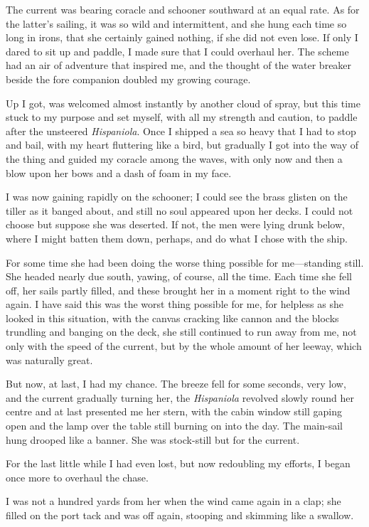 The current was bearing coracle and schooner southward at an equal rate. As for the latter’s sailing, it was so wild and intermittent, and she hung each time so long in irons, that she certainly gained nothing, if she did not even lose. If only I dared to sit up and paddle, I made sure that I could overhaul her. The scheme had an air of adventure that inspired me, and the thought of the water breaker beside the fore companion doubled my growing courage.

Up I got, was welcomed almost instantly by another cloud of spray, but this time stuck to my purpose and set myself, with all my strength and caution, to paddle after the unsteered \textit{Hispaniola}. Once I shipped a sea so heavy that I had to stop and bail, with my heart fluttering like a bird, but gradually I got into the way of the thing and guided my coracle among the waves, with only now and then a blow upon her bows and a dash of foam in my face.

I was now gaining rapidly on the schooner; I could see the brass glisten on the tiller as it banged about, and still no soul appeared upon her decks. I could not choose but suppose she was deserted. If not, the men were lying drunk below, where I might batten them down, perhaps, and do what I chose with the ship.

For some time she had been doing the worse thing possible for me---standing still. She headed nearly due south, yawing, of course, all the time. Each time she fell off, her sails partly filled, and these brought her in a moment right to the wind again. I have said this was the worst thing possible for me, for helpless as she looked in this situation, with the canvas cracking like cannon and the blocks trundling and banging on the deck, she still continued to run away from me, not only with the speed of the current, but by the whole amount of her leeway, which was naturally great.

But now, at last, I had my chance. The breeze fell for some seconds, very low, and the current gradually turning her, the \textit{Hispaniola} revolved slowly round her centre and at last presented me her stern, with the cabin window still gaping open and the lamp over the table still burning on into the day. The main-sail hung drooped like a banner. She was stock-still but for the current.

For the last little while I had even lost, but now redoubling my efforts, I began once more to overhaul the chase.

I was not a hundred yards from her when the wind came again in a clap; she filled on the port tack and was off again, stooping and skimming like a swallow.

